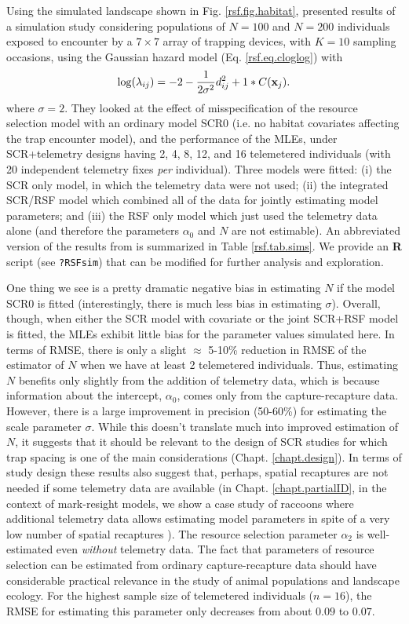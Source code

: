 Using the simulated landscape shown in Fig. \ref{rsf.fig.habitat},
\citet{royle_etal:2012mee} presented results of a simulation study
considering populations of $N=100$ and $N=200$ individuals exposed to
encounter by a
 $7 \times 7$ array of trapping devices,
with $K=10$ sampling occasions, using
the Gaussian hazard model
(Eq. \ref{rsf.eq.cloglog})
with
\[
\log(\lambda_{ij}) = -2  -\frac{1}{2\sigma^{2}} d_{ij}^{2} + 1 * C({\bf x}_{j}).
\]
where $\sigma =2$.
They looked at the effect of misspecification of the resource
selection model with an ordinary model SCR0 (i.e. no habitat
covariates affecting the trap encounter model), and the performance of
the MLEs, under SCR+telemetry designs having 2, 4, 8, 12, and 16
telemetered individuals (with 20 independent telemetry fixes {\it per}
individual). Three models were fitted: (i) the SCR only model, in
which the telemetry data were not used; (ii) the integrated SCR/RSF
model which combined all of the data for jointly estimating model
parameters; and (iii) the RSF only model which just used the telemetry
data alone (and therefore the parameters $\alpha_{0}$ and $N$ are not
estimable).  An abbreviated version of the results from
\citet{royle_etal:2012mee} is summarized in Table \ref{rsf.tab.sims}.
We provide an {\bf R} script (see \mbox{\tt ?RSFsim}) that can
be modified for further analysis and exploration.

One thing we see is a pretty dramatic negative bias in estimating $N$
if the model SCR0 is fitted (interestingly, there is much less bias in
estimating $\sigma$).  Overall, though, when either the SCR model with
covariate or the joint SCR+RSF model is fitted, the MLEs exhibit
little bias for the parameter values simulated here. In terms of RMSE,
there is only a slight $\approx$ 5-10\% reduction in RMSE of the
estimator of $N$ when we have at least 2 telemetered individuals.
Thus, estimating $N$ benefits only slightly from the addition of
telemetry data, which is because information about the intercept,
$\alpha_{0}$, comes only from the capture-recapture data.  However,
there is a large improvement in precision (50-60\%) for estimating the
scale parameter $\sigma$.  While this doesn't translate much into
improved estimation of $N$, it suggests that it should be relevant to
the design of SCR studies for which trap spacing is one of the main
considerations (Chapt. \ref{chapt.design}). In terms of study design
these results also suggest that, perhaps, spatial recaptures are not
needed if some telemetry data are available (in
Chapt. \ref{chapt.partialID}, in the context of mark-resight models,
we show a case study of raccoons where additional telemetry data
allows estimating model parameters in spite of a very low number of
spatial recaptures \citep{sollmann_etal:2012ecol}). The resource
selection parameter $\alpha_{2}$ is well-estimated even {\it without}
telemetry data. The fact that parameters of resource selection can be
estimated from ordinary capture-recapture data should have
considerable practical relevance in the study of animal populations
and landscape ecology. For the highest sample size of telemetered
individuals ($n=16$), the RMSE for estimating this parameter only
decreases from about $0.09$ to $0.07$.


